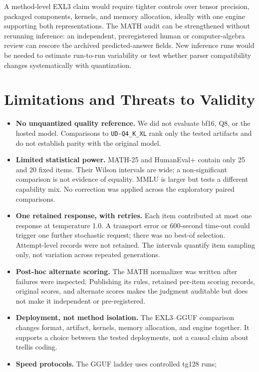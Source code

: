 \documentclass[11pt]{article}
\newcommand{\q}[1]{\texttt{#1}}
\begin{document}
A method-level EXL3 claim would require tighter controls over tensor
precision, packaged components, kernels, and memory allocation, ideally with
one engine supporting both representations. The MATH audit can be strengthened
without rerunning inference: an independent, preregistered human or
computer-algebra review can rescore the archived predicted-answer fields. New inference
runs would be needed to estimate run-to-run variability or test whether
parser compatibility changes systematically with quantization.

\section{Limitations and Threats to Validity}
\label{sec:limitations}

\begin{itemize}
  \item \textbf{No unquantized quality reference.} We did not evaluate bf16,
  Q8, or the hosted model. Comparisons to \q{UD-Q4\_K\_XL} rank only the
  tested artifacts and do not establish parity with the original model.
  \item \textbf{Limited statistical power.} MATH-25 and HumanEval+ contain
  only 25 and 20 fixed items. Their Wilson intervals are wide; a non-significant
  comparison is not evidence of equality. MMLU is larger but tests a different
  capability mix. No correction was applied across the exploratory paired
  comparisons.
  \item \textbf{One retained response, with retries.} Each item contributed
  at most one response at temperature 1.0. A transport error or 600-second
  time-out could trigger one further stochastic request; there was no best-of
  selection. Attempt-level records were not retained. The intervals quantify
  item sampling only, not variation across repeated generations.
  \item \textbf{Post-hoc alternate scoring.} The MATH normalizer was written
  after failures were inspected. Publishing its rules, retained per-item
  scoring records, original scores, and alternate scores makes the judgment
  auditable but does not make
  it independent or pre-registered.
  \item \textbf{Deployment, not method isolation.} The EXL3--GGUF comparison
  changes format, artifact, kernels, memory allocation, and engine together.
  It supports a choice between the tested deployments, not a causal claim
  about trellis coding.
  \item \textbf{Speed protocols.} The GGUF ladder uses controlled tg128 runs;

\end{itemize}
\end{document}
